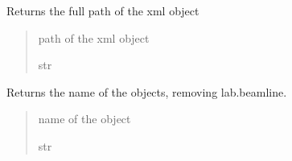 \documentclass[letterpaper,10pt,english]{sphinxmanual}
\begin{document}
\begin{fulllineitems}
\begin{fulllineitems}
\end{fulllineitems}


\begin{fulllineitems}
\label{\detokenize{API:raypyng.rml.ParamElement.get_full_path}}
\pysigstartsignatures
{}
\pysigstopsignatures
\sphinxAtStartPar
Returns the full path of the xml object
\begin{quote}\begin{description}
\sphinxAtStartPar
path of the xml object

\sphinxAtStartPar
str

\end{description}\end{quote}

\end{fulllineitems}


\begin{fulllineitems}
\label{\detokenize{API:raypyng.rml.ParamElement.resolvable_name}}
\pysigstartsignatures
{}
\pysigstopsignatures
\sphinxAtStartPar
Returns the name of the objects, removing lab.beamline.
\begin{quote}\begin{description}
\sphinxAtStartPar
name of the object

\sphinxAtStartPar
str

\end{description}\end{quote}

\end{fulllineitems}


\end{fulllineitems}




\renewcommand{\indexname}{Index}
\printindex
\end{document}
